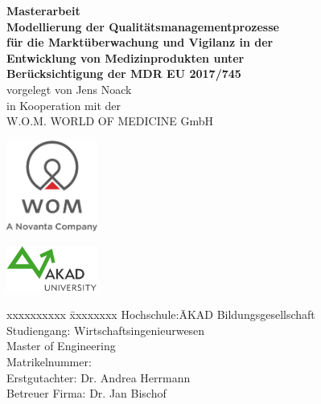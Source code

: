 \documentclass[a4paper,12pt]{report}
\begin{document}
\begin{titlepage}
\centering
\vfill
{\bfseries\Huge Masterarbeit}\\[2cm]
{\bfseries\Large Modellierung der Qualitätsmanagementprozesse}\\[0.2cm]
{\bfseries\Large für die Marktüberwachung und Vigilanz in der}\\[0.2cm]
{\bfseries\Large Entwicklung von Medizinprodukten unter}\\[0.2cm]
{\bfseries\Large Berücksichtigung der MDR EU 2017/745}\\
\vfill
vorgelegt von
\vfill
{\large Jens Noack}\\
\vfill
in Kooperation mit der\\[1cm]
{\large W.O.M. WORLD OF MEDICINE GmbH}\\[1cm]
\begin{center}
\begin{minipage}[c]{0.3\textwidth}
   \includegraphics[width  = 3cm]{Images/wom_logo}
  \end{minipage}
\begin{minipage}[c]{0.2\textwidth}
   \includegraphics[width  = 3cm]{Images/akad_logo}
  \end{minipage}
\end{center}
\vfill
\begin{center}\parbox{0cm}{\begin{tabbing}
xxxxxxxxxx \= xxxxxxxx \kill
Hochschule:\quad\quad\quad\quad\quad\quad\quad\quad\quad \= AKAD Bildungsgesellschaft \\
Studiengang: \> Wirtschaftsingenieurwesen \\
\> Master of Engineering \\
Matrikelnummer:  \\
Erstgutachter: \> Dr. Andrea Herrmann\\
Betreuer Firma: \> Dr. Jan Bischof
\end{tabbing}}
\end{center}
\end{titlepage}
\end{document}
